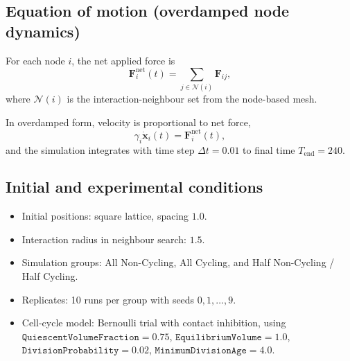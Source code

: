 \documentclass[11pt]{article}
\begin{document}
\subsection{Equation of motion (overdamped node dynamics)}
For each node \(i\), the net applied force is
\begin{equation}
\mathbf{F}^{\text{net}}_i(t)=\sum_{j\in\mathcal{N}(i)}\mathbf{F}_{ij},
\label{eq:net_force}
\end{equation}
where \(\mathcal{N}(i)\) is the interaction-neighbour set from the node-based mesh.

In overdamped form, velocity is proportional to net force,
\begin{equation}
\gamma_i \dot{\mathbf{x}}_i(t) = \mathbf{F}^{\text{net}}_i(t),
\label{eq:overdamped_update}
\end{equation}
and the simulation integrates with time step \(\Delta t=0.01\) to final time
\(T_{\text{end}}=240\).

\subsection{Initial and experimental conditions}
\begin{itemize}
  \item Initial positions: square lattice, spacing \(1.0\).
  \item Interaction radius in neighbour search: \(1.5\).
  \item Simulation groups: All Non-Cycling, All Cycling, and Half Non-Cycling / Half Cycling.
  \item Replicates: 10 runs per group with seeds \(0,1,\dots,9\).
  \item Cell-cycle model: Bernoulli trial with contact inhibition,
  using
  \(\texttt{QuiescentVolumeFraction}=0.75\),
  \(\texttt{EquilibriumVolume}=1.0\),
  \(\texttt{DivisionProbability}=0.02\),
  \(\texttt{MinimumDivisionAge}=4.0\).
\end{itemize}
\end{document}
